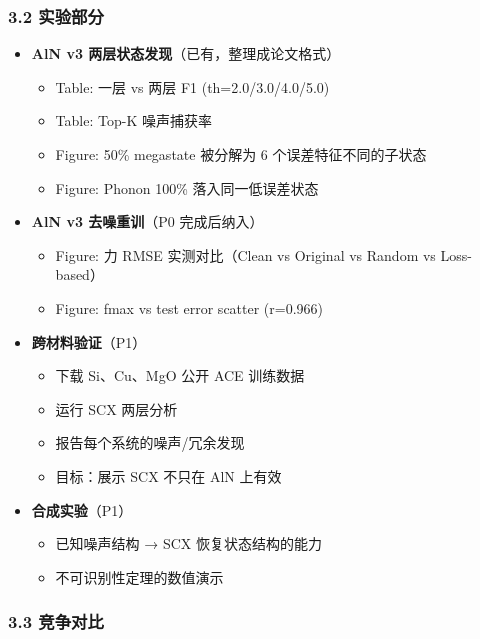 \documentclass[
  12pt,
]{ctexart}
\providecommand{\tightlist}{%
  \setlength{\itemsep}{0pt}\setlength{\parskip}{0pt}}
\begin{document}
\subsubsection{3.2 实验部分}\label{ux5b9eux9a8cux90e8ux5206}

\begin{itemize}
\tightlist
\item[$\square$]
  \textbf{AlN v3 两层状态发现}（已有，整理成论文格式）

  \begin{itemize}
  \tightlist
  \item
    Table: 一层 vs 两层 F1 (th=2.0/3.0/4.0/5.0)
  \item
    Table: Top-K 噪声捕获率
  \item
    Figure: 50\% megastate 被分解为 6 个误差特征不同的子状态
  \item
    Figure: Phonon 100\% 落入同一低误差状态
  \end{itemize}
\item[$\square$]
  \textbf{AlN v3 去噪重训}（P0 完成后纳入）

  \begin{itemize}
  \tightlist
  \item
    Figure: 力 RMSE 实测对比（Clean vs Original vs Random vs
    Loss-based）
  \item
    Figure: fmax vs test error scatter (r=0.966)
  \end{itemize}
\item[$\square$]
  \textbf{跨材料验证}（P1）

  \begin{itemize}
  \tightlist
  \item
    下载 Si、Cu、MgO 公开 ACE 训练数据
  \item
    运行 SCX 两层分析
  \item
    报告每个系统的噪声/冗余发现
  \item
    目标：展示 SCX 不只在 AlN 上有效
  \end{itemize}
\item[$\square$]
  \textbf{合成实验}（P1）

  \begin{itemize}
  \tightlist
  \item
    已知噪声结构 → SCX 恢复状态结构的能力
  \item
    不可识别性定理的数值演示
  \end{itemize}
\end{itemize}

\subsubsection{3.3 竞争对比}\label{ux7adeux4e89ux5bf9ux6bd4}
\end{document}
